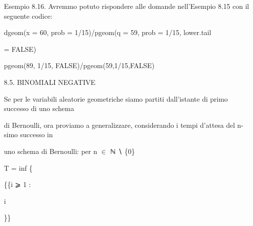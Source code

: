 \documentclass[a4paper,portrait,12pt]{article}
\begin{document}
\begin{flushleft}
Esempio 8.16. Avremmo potuto rispondere alle domande nell'Esempio 8.15 con il seguente codice:
\end{flushleft}





\begin{flushleft}
dgeom(x = 60, prob = 1/15)/pgeom(q = 59, prob = 1/15, lower.tail
\end{flushleft}


\begin{flushleft}
= FALSE)
\end{flushleft}


\begin{flushleft}
pgeom(89, 1/15, FALSE)/pgeom(59,1/15,FALSE)
\end{flushleft}





\begin{flushleft}
8.5. BINOMIALI NEGATIVE
\end{flushleft}


\begin{flushleft}
Se per le variabili aleatorie geometriche siamo partiti dall'istante di primo successo di uno schema
\end{flushleft}


\begin{flushleft}
di Bernoulli, ora proviamo a generalizzare, considerando i tempi d'attesa del n-simo successo in
\end{flushleft}


\begin{flushleft}
uno schema di Bernoulli: per n $\in$ ℕ ∖ \{0\}
\end{flushleft}


\begin{flushleft}
T = inf \{
\end{flushleft}


\begin{flushleft}
\{\{i ⩾ 1 :
\end{flushleft}





\begin{flushleft}
i
\end{flushleft}





\}\}
\end{document}
